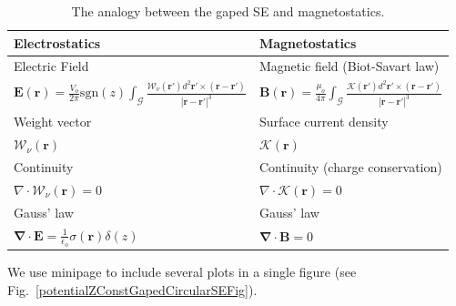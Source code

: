 \documentclass[10pt]{article}
\begin{document}
\begin{table}[h]
\begin{minipage}{.95\textwidth}
\begin{center}\small
    \begin{tabular}{ | p{7cm} | p{7cm} | }
    \hline
    \textbf{Electrostatics} & \textbf{Magnetostatics} \\ \hline
    Electric Field & Magnetic field (Biot-Savart law) \\
    $\boldsymbol{E}(\boldsymbol{r}) = \frac{V_o}{2\pi} \mbox{sgn}(z) \int_{\mathscr{G}}  \frac{\boldsymbol{\mathscr{W}}_{\nu}(\boldsymbol{r}')d^2 \boldsymbol{r}' \times (\boldsymbol{r}-\boldsymbol{r}')}{|\boldsymbol{r}-\boldsymbol{r}'|^3}$ & $\boldsymbol{B}(\boldsymbol{r}) = \frac{\mu_o}{4\pi} \int_{\mathscr{G}}  \frac{\boldsymbol{\mathscr{K}}(\boldsymbol{r}')d^2 \boldsymbol{r}' \times (\boldsymbol{r}-\boldsymbol{r}')}{|\boldsymbol{r}-\boldsymbol{r}'|^3}$ \\ \hline
    Weight vector & Surface current density\\
    $\boldsymbol{\mathscr{W}}_{\nu}(\boldsymbol{r})$ 
    & $\boldsymbol{\mathscr{K}}(\boldsymbol{r})$\\ \hline
    Continuity & Continuity (charge conservation) \\
    $\nabla \cdot \boldsymbol{\mathscr{W}}_{\nu}(\boldsymbol{r}) = 0 $
    &$\nabla \cdot \boldsymbol{\mathscr{K}}(\boldsymbol{r}) = 0$ \\\hline    
    Gauss' law & Gauss' law \\
    $\boldsymbol{\nabla}\cdot\boldsymbol{E} = \frac{1}{\epsilon_o}\sigma(\boldsymbol{r})\delta(z)$ 
    & $\boldsymbol{\nabla}\cdot\boldsymbol{B}=0$\\
    \hline
    \end{tabular}
    \caption {The analogy between the gaped SE and magnetostatics.}
    \label{analogiesTableEq}
\end{center}
\end{minipage}%
\end{table}


We use minipage to include several plots in a single figure (see Fig.~\ref{potentialZConstGapedCircularSEFig}).
\end{document}
